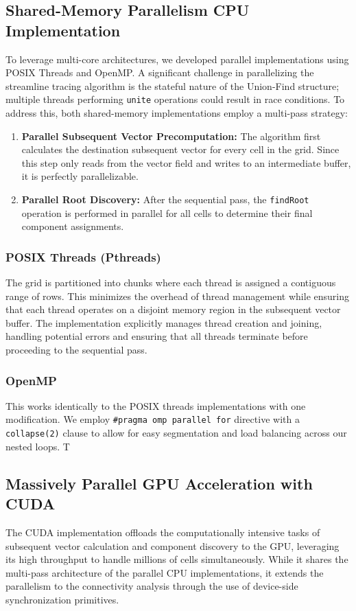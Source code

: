 \subsection{Shared-Memory Parallelism CPU Implementation}
To leverage multi-core architectures, we developed parallel implementations using POSIX Threads and OpenMP.
A significant challenge in parallelizing the streamline tracing algorithm is the stateful nature of the Union-Find structure; multiple threads performing \texttt{unite} operations could result in race conditions.
To address this, both shared-memory implementations employ a multi-pass strategy:
\begin{enumerate}
	\item \textbf{Parallel Subsequent Vector Precomputation:} The algorithm first calculates the destination subsequent vector for every cell in the grid.
	      Since this step only reads from the vector field and writes to an intermediate buffer, it is perfectly parallelizable.
	\item \textbf{Parallel Root Discovery:} After the sequential pass, the \texttt{findRoot} operation is performed in parallel for all cells to determine their final component assignments. \end{enumerate}

\subsubsection{POSIX Threads (Pthreads)}
The grid is partitioned into chunks where each thread is assigned a contiguous range of rows.
This minimizes the overhead of thread management while ensuring that each thread operates on a disjoint memory region in the subsequent vector buffer.
The implementation explicitly manages thread creation and joining, handling potential errors and ensuring that all threads terminate before proceeding to the sequential pass.

\subsubsection{OpenMP}
This works identically to the POSIX threads implementations with one modification.
We employ \texttt{\#pragma omp parallel for} directive with a \texttt{collapse(2)} clause to allow for easy segmentation and load balancing across our nested loops. T

\subsection{Massively Parallel GPU Acceleration with CUDA}
The CUDA implementation offloads the computationally intensive tasks of subsequent vector calculation and component discovery to the GPU, leveraging its high throughput to handle millions of cells simultaneously.
While it shares the multi-pass architecture of the parallel CPU implementations, it extends the parallelism to the connectivity analysis through the use of device-side synchronization primitives.

